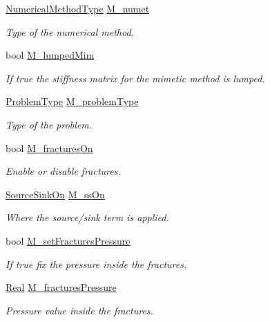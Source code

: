 \begin{DoxyCompactItemize}
\hyperlink{classFVCode3D_1_1Data_a5222e1901276af4586befd821445c6cf}{Numerical\+Method\+Type} \hyperlink{classFVCode3D_1_1Data_acabd10057aa8ce14f50ee7fbd354ac64}{M\+\_\+numet}
\begin{DoxyCompactList}\small\item\em Type of the numerical method. \end{DoxyCompactList}\item 
bool \hyperlink{classFVCode3D_1_1Data_a1eafd426e867afe23097e38c3d28fa2d}{M\+\_\+lumped\+Mim}
\begin{DoxyCompactList}\small\item\em If true the stiffness matrix for the mimetic method is lumped. \end{DoxyCompactList}\item 
\hyperlink{classFVCode3D_1_1Data_af17933074f5acdb699179763e6f43f23}{Problem\+Type} \hyperlink{classFVCode3D_1_1Data_a7d31023f4e0ca0377503c0a74797c5b3}{M\+\_\+problem\+Type}
\begin{DoxyCompactList}\small\item\em Type of the problem. \end{DoxyCompactList}\item 
bool \hyperlink{classFVCode3D_1_1Data_ab0b504d3e6e8ab604d4567eceb178aa7}{M\+\_\+fractures\+On}
\begin{DoxyCompactList}\small\item\em Enable or disable fractures. \end{DoxyCompactList}\item 
\hyperlink{classFVCode3D_1_1Data_a4d66e2e205b350cb240820540339e1a3}{Source\+Sink\+On} \hyperlink{classFVCode3D_1_1Data_af778c7ca663600660d71e09b2722ef57}{M\+\_\+ss\+On}
\begin{DoxyCompactList}\small\item\em Where the source/sink term is applied. \end{DoxyCompactList}\item 
bool \hyperlink{classFVCode3D_1_1Data_a50bb4aa8e225203af91e6221e6017549}{M\+\_\+set\+Fractures\+Pressure}
\begin{DoxyCompactList}\small\item\em If true fix the pressure inside the fractures. \end{DoxyCompactList}\item 
\hyperlink{namespaceFVCode3D_a40c1f5588a248569d80aa5f867080e83}{Real} \hyperlink{classFVCode3D_1_1Data_af04c830d4b03507186fbd36ad0ffcb2c}{M\+\_\+fractures\+Pressure}
\begin{DoxyCompactList}\small\item\em Pressure value inside the fractures. \end{DoxyCompactList}\item 

\end{DoxyCompactItemize}
